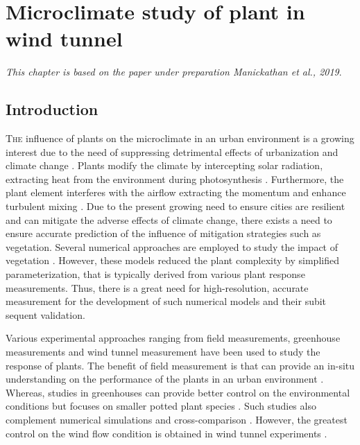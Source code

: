 \chapter{Microclimate study of plant in wind tunnel}
\label{ch:microclimatestudy}
\def\figdir{chapters/ch05_microclimatestudy/figures/}

\textit{This chapter is based on the paper under preparation Manickathan et al., 2019}.

\section{Introduction}

\lettrine[lines=3,nindent=0em,loversize=0.1]{T}{he} influence of plants on the microclimate in an urban environment is a growing interest due to the need of suppressing detrimental effects of urbanization and climate change \citep{Chen2006,Demuzere2014,Dimoudi2003,Matthews2017,Shashua-Bar2009b,Shashua-Bar2000}. Plants modify the climate by intercepting solar radiation, extracting heat from the environment during photosynthesis \citep{nobel2009physicochemical}. Furthermore, the plant element interferes with the airflow extracting the momentum and enhance turbulent mixing \citep{Finnigan2009, Gromke2014, Sanz2003}. Due to the present growing need to ensure cities are resilient and can mitigate the adverse effects of climate change, there exists a need to ensure accurate prediction of the influence of mitigation strategies such as vegetation. Several numerical approaches are employed to study the impact of vegetation \citep{Alexandri2008,Gromke2011,Manickathan2018a,Yang2017}. However, these models reduced the plant complexity by simplified parameterization, that is typically derived from various plant response measurements. Thus, there is a great need for high-resolution, accurate measurement for the development of such numerical models and their subit sequent validation.

Various experimental approaches ranging from field measurements, greenhouse measurements and wind tunnel measurement have been used to study the response of plants. The benefit of field measurement is that can provide an in-situ understanding on the performance of the plants in an urban environment \citep{Grant1998,Koizumi2016,Shashua-Bar2009b,Shashua-Bar2000}. Whereas, studies in greenhouses can provide better control on the environmental conditions but focuses on smaller potted plant species \citep{Fatnassi2006,Ganguly2009,Majdoubi2009,Montero2001}. Such studies also complement numerical simulations and cross-comparison \citep{Boulard2002, Kichah2012, Majdoubi2009}. However, the greatest control on the wind flow condition is obtained in wind tunnel experiments \citep{Grace1977, Liu2018, Manickathan2018b,Miri2019}.

